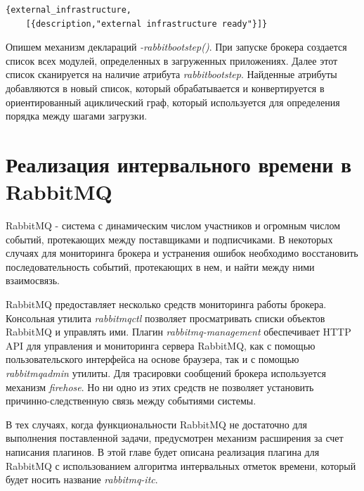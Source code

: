 \begin{lstlisting}
{external_infrastructure,
    [{description,"external infrastructure ready"}]}
\end{lstlisting}
Опишем механизм деклараций \textit{-rabbit\underline{\hspace{0.25cm}}boot\underline{\hspace{0.25cm}}step()}. При запуске брокера создается список всех модулей, определенных в загруженных приложениях. Далее этот список сканируется на наличие атрибута \textit{rabbit\underline{\hspace{0.25cm}}boot\underline{\hspace{0.25cm}}step}. Найденные атрибуты добавляются в новый список, который обрабатывается и конвертируется в ориентированный ациклический граф, который используется для определения порядка между шагами загрузки.

\chapter{Реализация интервального времени в RabbitMQ}
RabbitMQ - система с динамическим числом участников и огромным числом событий, протекающих между поставщиками и подписчиками. В некоторых случаях для мониторинга брокера и устранения ошибок необходимо восстановить последовательность событий, протекающих в нем, и найти между ними взаимосвязь.\par
RabbitMQ предоставляет несколько средств мониторинга работы брокера. Консольная утилита \textit{rabbitmqctl} позволяет просматривать списки объектов RabbitMQ и управлять ими. Плагин \textit{rabbitmq-management} обеспечивает HTTP API для управления и мониторинга сервера RabbitMQ, как с помощью пользовательского интерфейса на основе браузера, так и с помощью  \textit{rabbitmqadmin} утилиты. Для трасировки сообщений брокера используется механизм \textit{firehose}. Но ни одно из этих средств не позволяет установить причинно-следственную связь между событиями системы. \par 
В тех случаях, когда функциональности RabbitMQ не достаточно для выполнения поставленной задачи, предусмотрен механизм расширения за счет написания плагинов. В этой главе будет описана реализация плагина для RabbitMQ с использованием алгоритма интервальных отметок времени, который будет носить название \textit{rabbitmq-itc}.


